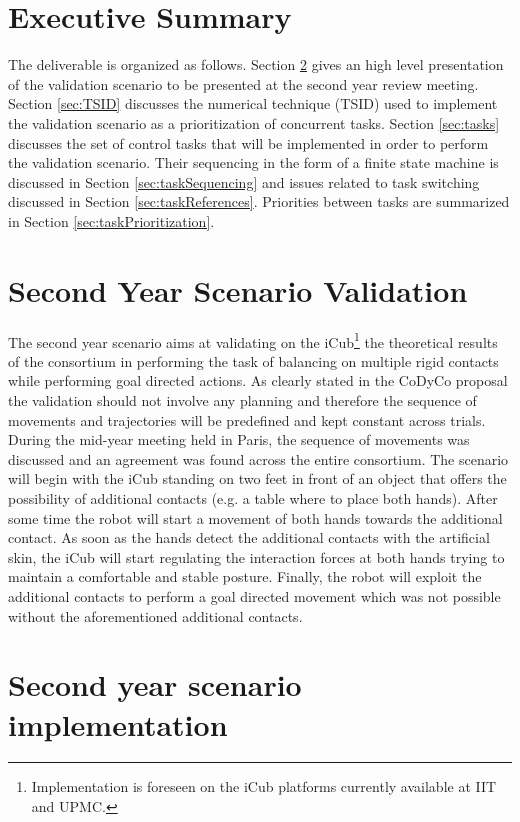 \documentclass[12pt,a4paper,twoside]{article}
\begin{document}
\section{Executive Summary}

The deliverable is organized as follows. Section \ref{sec:secondYearScenario} gives an high level presentation of the validation scenario to be presented at the second year review meeting. Section \ref{sec:TSID} discusses the numerical technique (TSID) used to implement the validation scenario as a prioritization of concurrent tasks. Section \ref{sec:tasks} discusses the set of control tasks that will be implemented in order to perform the validation scenario.  Their sequencing in the form of a finite state machine is discussed in Section \ref{sec:taskSequencing} and issues related to task switching discussed in Section \ref{sec:taskReferences}. Priorities between tasks are summarized in Section \ref{sec:taskPrioritization}.

\section{Second Year Scenario Validation} \label{sec:secondYearScenario}

The second year scenario aims at validating on the iCub\footnote{ Implementation is foreseen on the iCub platforms currently available at IIT and UPMC.} the theoretical results of the consortium in performing the task of balancing on multiple rigid contacts while performing goal directed actions. As clearly stated in the CoDyCo proposal the validation should not involve any planning and therefore the sequence of movements and trajectories will be predefined and kept constant across trials. During the mid-year meeting held in Paris, the sequence of movements was discussed and an agreement was found across the entire consortium. The scenario will begin with the iCub standing on two feet in front of an object that offers the possibility of additional contacts (e.g. a table where to place both hands). After some time the robot will start a movement of both hands towards the additional contact. As soon as the hands detect the additional contacts with the artificial skin, the iCub will start regulating the interaction forces at both hands trying to maintain a comfortable and stable posture. Finally, the robot will exploit the additional contacts to perform a goal directed movement which was not possible without the aforementioned additional contacts.

\section{Second year scenario implementation}
\end{document}
